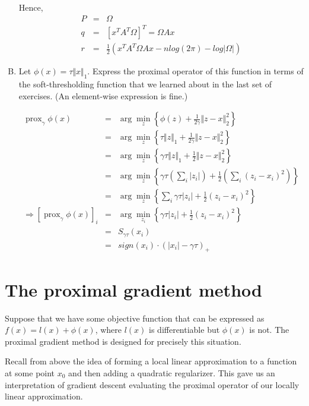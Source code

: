 \documentclass{article}
\newcommand{\prox}{ \mathop{\mathrm{prox}} }
\newcommand{\enorm}[1]{\Vert #1 \Vert_2}
\begin{document}
\begin{enumerate}[(A)]
Hence, 
\begin{eqnarray*}
P &=& \Omega\\
q &=&[x^TA^T \Omega]^T = \Omega A x\\
r &=&  \frac{1}{2} \left( x^TA^T \Omega Ax - n log(2\pi) - log|\Omega|   \right)
\end{eqnarray*}
\color{black}

\item  Let $\phi(x) = \tau \Vert x \Vert_1$.  Express the proximal operator of this function in terms of the soft-thresholding function that we learned about in the last set of exercises.  (An element-wise expression is fine.)

\color{blue}
\begin{eqnarray*}
\prox_{\gamma} \phi(x) &=& \arg \min_{z } \left\{  \phi(z)+ \frac{1}{2\gamma} \enorm{z - x}^2  \right\} \\
&=& \arg \min_{z } \left\{ \tau \Vert z \Vert_1 + \frac{1}{2\gamma} \enorm{z - x}^2  \right\} \\
&=& \arg \min_{z } \left\{\gamma \tau \Vert z \Vert_1 + \frac{1}{2} \enorm{z - x}^2  \right\} \\
&=& \arg \min_{z } \left\{\gamma\tau \left( \sum_i  | z_i | \right)+ \frac{1}{2} \left( \sum_i (z_i - x_i)^2 \right)  \right\} \\
&=& \arg \min_{z } \left\{ \sum_i  \gamma\tau| z_i | +   \frac{1}{2}(z_i - x_i)^2   \right\} \\
\Rightarrow \left[ \prox_{\gamma} \phi(x)\right]_i &=&\arg \min_{z_i } \left\{\gamma\tau| z_i | +   \frac{1}{2}(z_i - x_i)^2   \right\}\\
&=& S_{\gamma\tau}(x_i) \\
&=& sign(x_i) \cdot (|x_i| - \gamma\tau)_+ 
\end{eqnarray*}
\color{black}


\end{enumerate}


\section{The proximal gradient method}

Suppose that we have some objective function that can be expressed as $f(x) = l(x) + \phi(x)$, where $l(x)$ is differentiable but $\phi(x)$ is not.  The proximal gradient method is designed for precisely this situation.

Recall from above the idea of forming a local linear approximation to a function at some point $x_0$ and then adding a quadratic regularizer.  This gave us an interpretation of gradient descent evaluating the proximal operator of our locally linear approximation.
\end{document}
